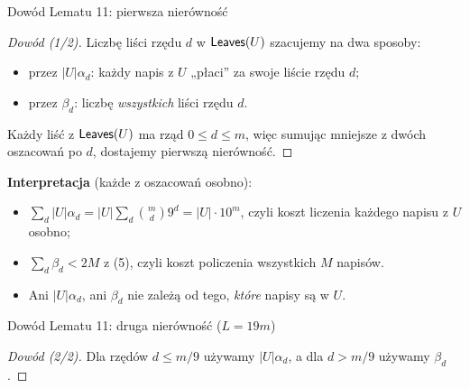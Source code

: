 \begin{frame}{Dowód Lematu 11: pierwsza nierówność}
  \begin{proof}[Dowód (1/2)]
    Liczbę liści rzędu $d$ w $\mathsf{Leaves}(U)$ szacujemy na dwa sposoby:
    \begin{itemize}
      \item przez $|U|\alpha_d$: każdy napis z $U$ „płaci” za swoje liście rzędu $d$;
      \item przez $\beta_d$: liczbę \emph{wszystkich} liści rzędu $d$.
    \end{itemize}
    Każdy liść z $\mathsf{Leaves}(U)$ ma rząd $0\le d\le m$, więc sumując mniejsze z dwóch oszacowań po $d$, dostajemy pierwszą nierówność.
  \end{proof}
  \pause
  \textbf{Interpretacja} (każde z oszacowań osobno):
  \begin{itemize}
    \item $\sum_d|U|\alpha_d=|U|\sum_d\binom md9^d=|U|\cdot10^m$, czyli koszt liczenia każdego napisu z $U$ osobno;
    \item $\sum_d\beta_d<2M$ z (5), czyli koszt policzenia wszystkich $M$ napisów.
    \item Ani $|U|\alpha_d$, ani $\beta_d$ nie zależą od tego, \emph{które} napisy są w $U$.
  \end{itemize}
\end{frame}

\begin{frame}{Dowód Lematu 11: druga nierówność ($L=19m$)}
  \begin{proof}[Dowód (2/2)]
    Dla rzędów $d\le m/9$ używamy $|U|\alpha_d$, a dla $d>m/9$ używamy $\beta_d$.


  \end{proof}
\end{frame}


